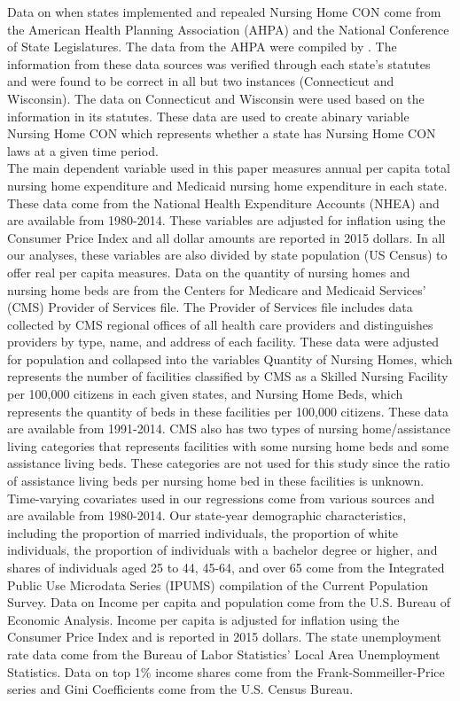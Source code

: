 \documentclass[../Main.tex]{subfiles}
\begin{document}
Data on when states implemented and repealed Nursing Home CON come from the American Health Planning Association (AHPA) and the National Conference of State Legislatures. The data from the AHPA were compiled by \citet{stratmann2014certificate}. The information from these data sources was verified through each state’s statutes and were found to be correct in all but two instances (Connecticut and Wisconsin). The data on Connecticut and Wisconsin were used based on the information in its statutes. These data are used to create abinary variable Nursing Home CON which represents whether a state has Nursing Home CON laws at a given time period.\\
\indent The main dependent variable used in this paper measures annual per capita total nursing home expenditure and Medicaid nursing home expenditure in each state. These data come from the National Health Expenditure Accounts (NHEA) and are available from 1980-2014. These variables are adjusted for inflation using the Consumer Price Index and all dollar amounts are reported in 2015 dollars. In all our analyses, these variables are also divided by state population (US Census) to offer real per capita measures. Data on the quantity of nursing homes and nursing home beds are from the Centers for Medicare and Medicaid Services’ (CMS) Provider of Services file. The Provider of Services file includes data collected by CMS regional offices of all health care providers and distinguishes providers by type, name, and address of each facility. These data were adjusted for population and collapsed into the variables Quantity of Nursing Homes, which represents the number of facilities classified by CMS as a Skilled Nursing Facility per 100,000 citizens in each given states, and Nursing Home Beds, which represents the quantity of beds in these facilities per 100,000 citizens. These data are available from 1991-2014. CMS also has two types of nursing home/assistance living categories that represents facilities with some nursing home beds and some assistance living beds. These categories are not used for this study since the ratio of assistance living beds per nursing home bed in these facilities is unknown. \\
\indent Time-varying covariates used in our regressions come from various sources and are available from 1980-2014. Our state-year demographic characteristics, including the proportion of married individuals, the proportion of white individuals, the proportion of individuals with a bachelor degree or higher, and shares of individuals aged 25 to 44, 45-64, and over 65 come from the Integrated Public Use Microdata Series (IPUMS) compilation of the Current Population Survey. Data on Income per capita and population come from the U.S. Bureau of Economic Analysis. Income per capita is adjusted for inflation using the Consumer Price Index and is reported in 2015 dollars. The state unemployment rate data come from the Bureau of Labor Statistics’ Local Area Unemployment Statistics. Data on top 1\% income shares come from the Frank-Sommeiller-Price series \citep{frank2015performance} and Gini Coefficients come from the U.S. Census Bureau.
\end{document}
